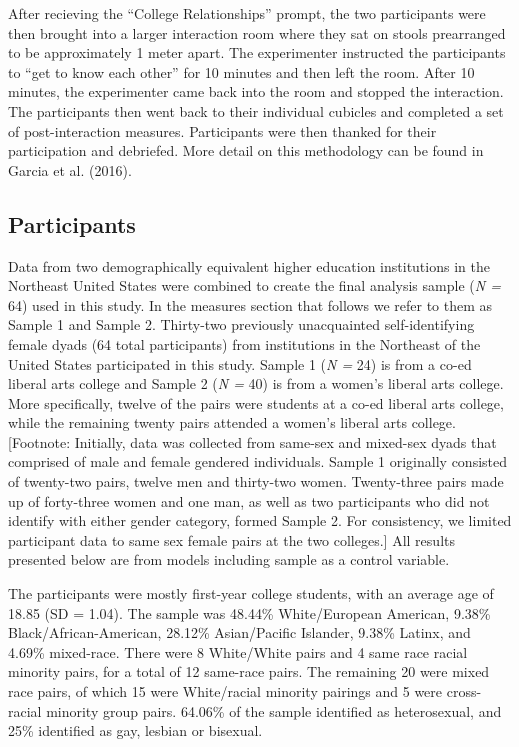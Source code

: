 \documentclass[man]{apa6}
\begin{document}
After recieving the \enquote{College Relationships} prompt, the two
participants were then brought into a larger interaction room where they
sat on stools prearranged to be approximately 1 meter apart. The
experimenter instructed the participants to \enquote{get to know each
other} for 10 minutes and then left the room. After 10 minutes, the
experimenter came back into the room and stopped the interaction. The
participants then went back to their individual cubicles and completed a
set of post-interaction measures. Participants were then thanked for
their participation and debriefed. More detail on this methodology can
be found in Garcia et al. (2016).

\subsection{Participants}\label{participants}

Data from two demographically equivalent higher education institutions
in the Northeast United States were combined to create the final
analysis sample (\emph{N =} 64) used in this study. In the measures
section that follows we refer to them as Sample 1 and Sample 2.
Thirty-two previously unacquainted self-identifying female dyads (64
total participants) from institutions in the Northeast of the United
States participated in this study. Sample 1 (\emph{N =} 24) is from a
co-ed liberal arts college and Sample 2 (\emph{N =} 40) is from a
women's liberal arts college. More specifically, twelve of the pairs
were students at a co-ed liberal arts college, while the remaining
twenty pairs attended a women's liberal arts college. {[}Footnote:
Initially, data was collected from same-sex and mixed-sex dyads that
comprised of male and female gendered individuals. Sample 1 originally
consisted of twenty-two pairs, twelve men and thirty-two women.
Twenty-three pairs made up of forty-three women and one man, as well as
two participants who did not identify with either gender category,
formed Sample 2. For consistency, we limited participant data to same
sex female pairs at the two colleges.{]} All results presented below are
from models including sample as a control variable.

The participants were mostly first-year college students, with an
average age of 18.85 (SD = 1.04). The sample was 48.44\% White/European
American, 9.38\% Black/African-American, 28.12\% Asian/Pacific Islander,
9.38\% Latinx, and 4.69\% mixed-race. There were 8 White/White pairs and
4 same race racial minority pairs, for a total of 12 same-race pairs.
The remaining 20 were mixed race pairs, of which 15 were White/racial
minority pairings and 5 were cross-racial minority group pairs. 64.06\%
of the sample identified as heterosexual, and 25\% identified as gay,
lesbian or bisexual.
\end{document}

